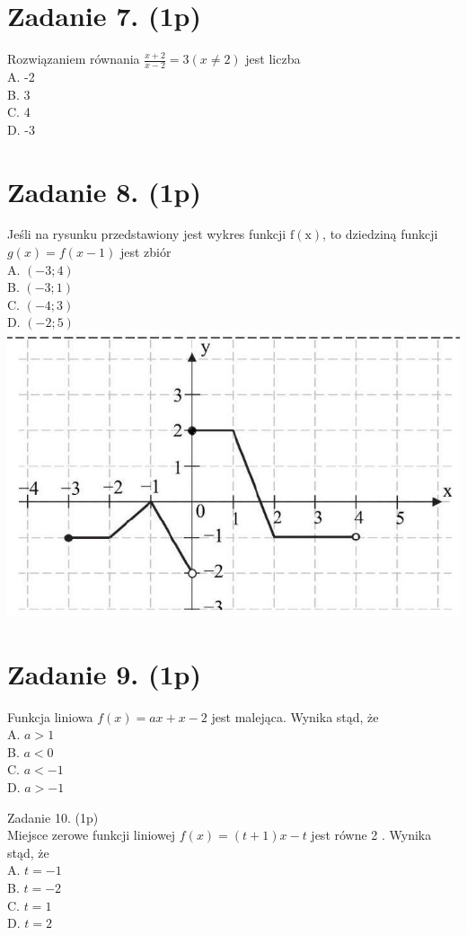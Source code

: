 \documentclass[10pt]{article}
\begin{document}
\section*{Zadanie 7. (1p)}
Rozwiązaniem równania \(\frac{x+2}{x-2}=3(x \neq 2)\) jest liczba\\
A. -2\\
B. 3\\
C. 4\\
D. -3

\section*{Zadanie 8. (1p)}
Jeśli na rysunku przedstawiony jest wykres funkcji \(\mathrm{f}(\mathrm{x})\), to dziedziną funkcji \(g(x)=f(x-1)\) jest zbiór\\
A. \((-3 ; 4)\)\\
B. \((-3 ; 1)\)\\
C. \((-4 ; 3)\)\\
D. \((-2 ; 5)\)\\
\includegraphics[max width=\textwidth, center]{2024_11_21_fb7e622176e162773107g-04(1)}

\section*{Zadanie 9. (1p)}
Funkcja liniowa \(f(x)=a x+x-2\) jest malejąca. Wynika stąd, że\\
A. \(a>1\)\\
B. \(a<0\)\\
C. \(a<-1\)\\
D. \(a>-1\)

Zadanie 10. (1p)\\
Miejsce zerowe funkcji liniowej \(f(x)=(t+1) x-t\) jest równe 2 . Wynika stąd, że\\
A. \(t=-1\)\\
B. \(t=-2\)\\
C. \(t=1\)\\
D. \(t=2\)
\end{document}
